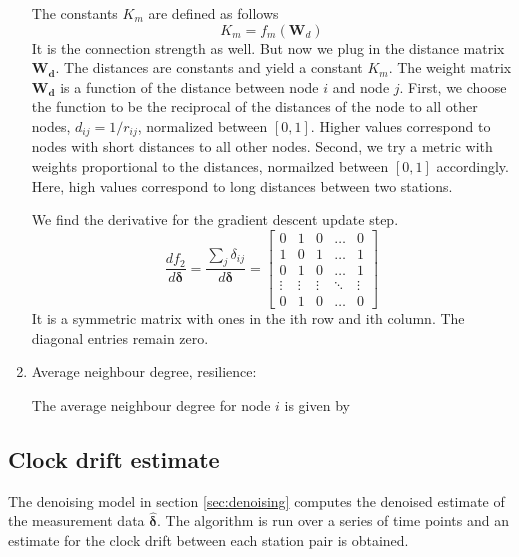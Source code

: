 \documentclass[12pt,a4paper,english]{article}
\begin{document}
\begin{enumerate}
The constants $K_m$ are defined as follows
\begin{equation}
K_m=f_m(\bm W_d)
\end{equation}
It is the connection strength as well. But now we plug in the distance matrix $\bm{W_d}$. The distances are constants and yield a constant $K_m$.
The weight matrix $\bm{W_d}$ is a function of the distance between node $i$ and node $j$. First, we choose the function to be the reciprocal of the distances of the node to all other nodes, $d _{ij}= 1/r_{ij}$, normalized between $[0,1]$. Higher values correspond to nodes with short distances to all other nodes. Second, we try a metric with weights proportional to the distances, normailzed between $[0,1]$ accordingly. Here, high values correspond to long distances between two stations.

We find the derivative for the gradient descent update step.
\begin{equation}
\frac{df_2}{d\bm{\delta}}=\frac{\sum_j\delta_{ij}}{d\bm{\delta}}=
\begin{bmatrix}
    0 & 1 & 0 & \dots  & 0 \\
    1 & 0 & 1 & \dots  & 1 \\
    0 & 1 & 0 & \dots  & 1 \\
    \vdots & \vdots & \vdots & \ddots & \vdots \\
    0 & 1 & 0 & \dots  & 0
\end{bmatrix}
\end{equation}
It is a symmetric matrix with ones in the ith row and ith column. The diagonal entries remain zero.





 
\item Average neighbour degree, resilience: 

The average neighbour degree for node $i$ is given by

\end{enumerate}

\subsection{Clock drift estimate}

The denoising model in section \ref{sec:denoising} computes the denoised estimate of the measurement data $\bm{\hat{\delta}}$. The algorithm is run over a series of time points and an estimate for the clock drift between each station pair is obtained. 
\end{document}
